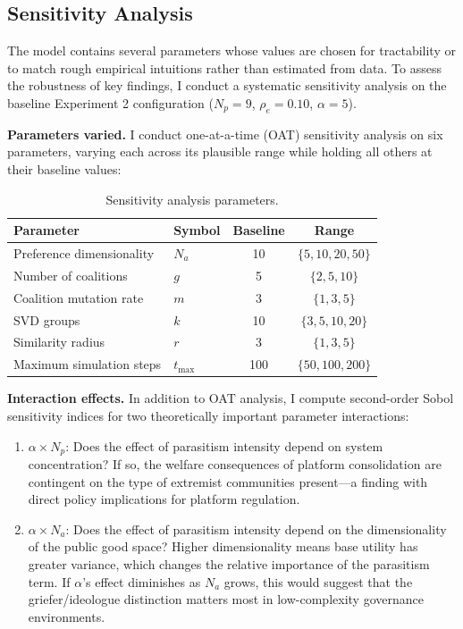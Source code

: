\documentclass[12pt]{article}
\begin{document}
\subsection{Sensitivity Analysis}
\label{sec:sensitivity}

The model contains several parameters whose values are chosen for tractability or to match rough empirical intuitions rather than estimated from data. To assess the robustness of key findings, I conduct a systematic sensitivity analysis on the baseline Experiment 2 configuration ($N_p = 9$, $\rho_e = 0.10$, $\alpha = 5$).

\textbf{Parameters varied.} I conduct one-at-a-time (OAT) sensitivity analysis on six parameters, varying each across its plausible range while holding all others at their baseline values:

\begin{table}[h]
\centering
\begin{tabular}{llcc}
\hline
\textbf{Parameter} & \textbf{Symbol} & \textbf{Baseline} & \textbf{Range} \\
\hline \hline
Preference dimensionality & $N_a$ & 10 & $\{5, 10, 20, 50\}$ \\
Number of coalitions & $g$ & 5 & $\{2, 5, 10\}$ \\
Coalition mutation rate & $m$ & 3 & $\{1, 3, 5\}$ \\
SVD groups & $k$ & 10 & $\{3, 5, 10, 20\}$ \\
Similarity radius & $r$ & 3 & $\{1, 3, 5\}$ \\
Maximum simulation steps & $t_{\max}$ & 100 & $\{50, 100, 200\}$ \\
\hline
\end{tabular}
\caption{Sensitivity analysis parameters.}
\label{tab:sensitivity}
\end{table}

\textbf{Interaction effects.} In addition to OAT analysis, I compute second-order Sobol sensitivity indices for two theoretically important parameter interactions:

\begin{enumerate}
    \item $\alpha \times N_p$: Does the effect of parasitism intensity depend on system concentration? If so, the welfare consequences of platform consolidation are contingent on the type of extremist communities present---a finding with direct policy implications for platform regulation.
    \item $\alpha \times N_a$: Does the effect of parasitism intensity depend on the dimensionality of the public good space? Higher dimensionality means base utility has greater variance, which changes the relative importance of the parasitism term. If $\alpha$'s effect diminishes as $N_a$ grows, this would suggest that the griefer/ideologue distinction matters most in low-complexity governance environments.
\end{enumerate}
\end{document}
